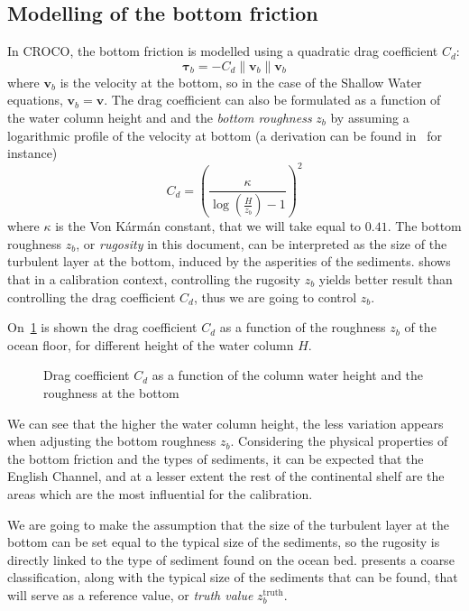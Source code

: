 \documentclass[../../Main_ManuscritThese.tex]{subfiles}
\newcommand{\CROCO}{CROCO}
\newcommand{\zob}{z_b}
\newcommand\imgpath{/home/victor/acadwriting/Manuscrit/Text/Chapter5/img/}
\begin{document}
\subsection{Modelling of the bottom friction}
\label{ssec:modelling_bottom}
In \CROCO, the bottom friction is modelled using a quadratic drag
coefficient $C_d$:
\begin{equation}
  \label{eq:bottom_stress_tau}
  \bm{\tau}_b= -C_d \|\mathbf{v}_b\|\mathbf{v}_b 
\end{equation}
where $\mathbf{v}_b$ is the velocity at the bottom, so in the case
of the Shallow Water equations, $\mathbf{v}_b = \mathbf{v}$.  The
drag coefficient can also be formulated as a function of the water
column height and and the \emph{bottom roughness} $\zob$ by assuming a
logarithmic profile of the velocity at bottom (a derivation can be found in~\cite{le_bars_amandes_2010} for instance)
\begin{equation}
  \label{eq:quadratic_friction_vonkarman}
  C_d = \left(\frac{\kappa}{\log\left(\frac{H}{\zob}\right) - 1}\right)^2%
\end{equation}
where $\kappa$ is the Von K\'arm\'an constant, that we will take equal
to $0.41$.  The bottom roughness $\zob$, or \emph{rugosity} in this
document, can be interpreted as the size of the turbulent layer at the
bottom, induced by the asperities of the sediments.
\cite{boutet_estimation_2015} shows that in a calibration
context, controlling the rugosity $\zob$ yields better result than
controlling the drag coefficient $C_d$, thus we are going to control $\zob$.


On~\cref{fig:cd_zob} is shown the drag coefficient $C_d$ as a function
of the roughness $\zob$ of the ocean floor, for different height of
the water column $H$.
\begin{figure}[ht]
  \centering 
  \caption{\label{fig:cd_zob} Drag coefficient $C_d$ as a function of
    the column water height and the roughness at the bottom}
\end{figure}
We can see that the higher the water column height, the less variation
appears when adjusting the bottom roughness $\zob$.  Considering the
physical properties of the bottom friction and the types of sediments,
it can be expected that the English Channel, and at a lesser extent
the rest of the continental shelf are the areas which are the most
influential for the calibration.


We are going to make the assumption that the size of the turbulent
layer at the bottom can be set equal to the typical size of the
sediments, so the rugosity is directly linked to the type of sediment
found on the ocean bed.  presents a coarse
classification, along with the typical size of the sediments that can
be found, that will serve as a reference value, or \emph{truth value}
$\zob^{\mathrm{truth}}$.  %
\end{document}
